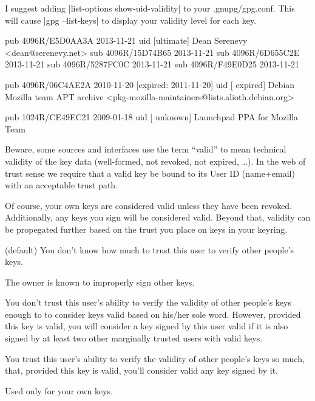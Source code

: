 \documentclass[letterpaper]{article}
\makeatletter
\def\section{\@startsection{section}{1}{\z@}{-2ex\@plus-.5ex\@minus-.2ex}{.001ex\@plus0ex\@minus.3ex}{\normalfont\Large\sffamily\bfseries}}
\def\tightitems{\setlength{\parskip}{0pt}}
\def\TODO#1{\textsl{[[TODO: #1]]}}
\renewcommand{\_}[1]{\ifmmode_{_{#1}}\else\underline{\phantom{n}}$\,$#1\fi}
\makeatother
\begin{document}
\section{Web of Trust}


I suggest adding |list-options show-uid-validity| to your .gnupg/gpg.conf.
This will cause |gpg --list-keys| to display your validity level for each
key.

\begin{code}
  pub   4096R/E5D0AA3A 2013-11-21
  uid       [ultimate] Dean Serenevy <dean@serenevy.net>
  sub   4096R/15D74B65 2013-11-21
  sub   4096R/6D655C2E 2013-11-21
  sub   4096R/5287FC0C 2013-11-21
  sub   4096R/F49E0D25 2013-11-21

  pub   4096R/06C4AE2A 2010-11-20 [expired: 2011-11-20]
  uid       [ expired] Debian Mozilla team APT archive <pkg-mozilla-maintainers@lists.alioth.debian.org>

  pub   1024R/CE49EC21 2009-01-18
  uid       [ unknown] Launchpad PPA for Mozilla Team
\end{code}

Beware, some sources and interfaces use the term ``valid'' to mean
technical validity of the key data (well-formed, not revoked, not expired,
\dots). In the web of trust sense we require that a valid key be bound to
its User ID (name+email) with an acceptable trust path.

Of course, your own keys are considered valid unless they have been
revoked. Additionally, any keys you sign will be considered valid. Beyond
that, validity can be propegated further based on the trust you place on
keys in your keyring.

\begin{description}\tightitems
\item[Unknown] (default) You don't know how much to trust this user to
  verify other people's keys.

\item[Never] The owner is known to improperly sign other keys.

\item[Marginal] You don't trust this user's ability to verify the validity
  of other people's keys enough to to consider keys valid based on his/her
  sole word. However, provided this key is valid, you will consider a key
  signed by this user valid if it is also signed by at least two other
  marginally trusted users with valid keys.

\item[Full] You trust this user's ability to verify the validity of other
  people's keys so much, that, provided this key is valid, you'll consider
  valid any key signed by it.

\item[Ultimate] Used only for your own keys.
\end{description}
\end{document}
